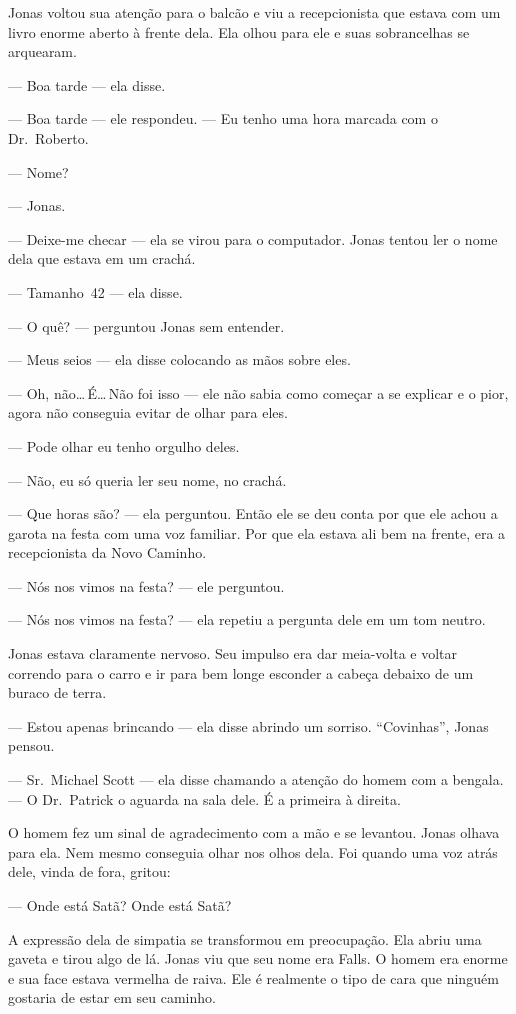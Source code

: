Jonas voltou sua atenção para o balcão e viu a recepcionista que estava com um livro enorme aberto à frente dela. Ela olhou para ele e suas sobrancelhas se arquearam.

--- Boa tarde --- ela disse.

--- Boa tarde --- ele respondeu. --- Eu tenho uma hora marcada com o Dr.~Roberto.

--- Nome?

--- Jonas.

--- Deixe-me checar --- ela se virou para o computador. Jonas tentou ler o nome dela que estava em um crachá.

--- Tamanho~42 --- ela disse.

--- O quê? --- perguntou Jonas sem entender.

--- Meus seios --- ela disse colocando as mãos sobre eles.

--- Oh, não\ldots\,É\ldots\,Não foi isso --- ele não sabia como começar a se explicar e\mudanca{,} o pior, agora não conseguia evitar de olhar para eles.

--- Pode olhar\mudanca{,} eu tenho orgulho deles.

--- Não, eu só queria ler seu nome, no crachá.

--- Que horas são? --- ela perguntou. Então ele se deu conta por que ele achou a garota na festa com uma voz familiar. Por que ela estava ali bem na frente, era a recepcionista da Novo Caminho.

--- Nós nos vimos na festa? --- ele perguntou.

--- Nós nos vimos na festa? --- ela repetiu a pergunta dele em um tom neutro.

Jonas estava claramente nervoso. Seu impulso era dar meia-volta e voltar correndo para o carro e ir para bem longe esconder a cabeça debaixo de um buraco de terra.

--- Estou apenas brincando --- ela disse abrindo um sorriso. ``Covinhas'', Jonas pensou.

--- Sr.~Michael Scott --- ela disse chamando a atenção do homem com a bengala. --- O Dr.~Patrick o aguarda na sala dele. É a primeira à direita.

O homem fez um sinal de agradecimento com a mão e se levantou. Jonas olhava para ela. Nem mesmo conseguia olhar nos olhos dela. Foi quando uma voz atrás dele, vinda de fora, gritou:

--- Onde está Satã? Onde está Satã?

A expressão dela de simpatia se transformou em preocupação. Ela abriu uma gaveta e tirou algo de lá. Jonas viu que seu nome era Falls. O homem era enorme e sua face estava vermelha de raiva. Ele é realmente o tipo de cara que ninguém gostaria de estar em seu caminho.

